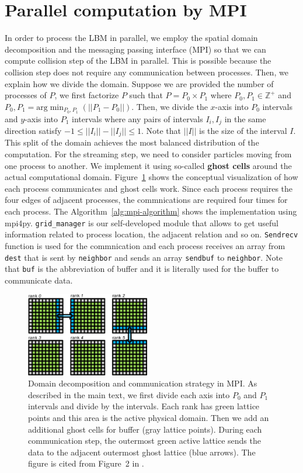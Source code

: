 \section{Parallel computation by MPI}\label{section-mpi}
In order to process the LBM in parallel,
we employ the spatial domain decomposition and
the messaging passing interface (MPI)
so that we can compute collision step of the LBM
in parallel.
This is possible because the collision step does not require
any communication between processes\cite{pastewka2019hpc}.
Then, we explain how we divide the domain.
Suppose we are provided the number of processes of $P$,
we first factorize $P$ such that $P = P_0 \times P_1$
where $P_0, P_1 \in \mathbb{Z}^{+}$
and $P_0, P_1 = \text{arg} \min_{P_0, P_1}(|| P_1 - P_0 ||)$.
Then, we divide the $x$-axis into $P_0$ intervals and
$y$-axis into $P_1$ intervals where
any pairs of intervals $I_{i}, I_{j}$ in the same direction satisfy
$-1 \leq || I_{i} || - ||I_{j}|| \leq 1$.
Note that $||I||$ is the size of the interval $I$.
This split of the domain achieves the most balanced distribution of
the computation.
For the streaming step, we need to consider particles
moving from one process to another.
We implement it using so-called {\bf ghost cells}
around the actual computational domain.
Figure~\ref{mpi-conceptual} shows the conceptual visualization of
how each process communicates and ghost cells work.
Since each process requires the four edges of adjacent
processes, the commnications are required four times
for each process.
The Algorithm~\ref{alg:mpi-algorithm}
shows the implementation using mpi4py.
{\tt grid\_manager} is our self-developed module
that allows to get useful information related to
process location, the adjacent relation and so on.
{\tt Sendrecv} function is used for the commnication and
each process receives an array from {\tt dest} that is sent
by {\tt neighbor} and sends an array {\tt sendbuf} to
{\tt neighbor}.
Note that {\tt buf} is the abbreviation of buffer and
it is literally used for the buffer to communicate data.

\begin{figure}
  \centering
  \includegraphics[width=0.48\textwidth]{imgs/mpi-conceptual.pdf}
  \caption{
    Domain decomposition and communication strategy in MPI.
    As described in the main text, we first divide each axis
    into $P_0$ and $P_1$ intervals and divide by the intervals.
    Each rank has green lattice points and this area is the active physical domain.
    Then we add an additional ghost cells for buffer (gray lattice points).
    During each communication step, the outermost green active lattice
    sends the data to the adjacent outermost ghost lattice (blue arrows).
    The figure is cited from Figure~2 in \cite{pastewka2019hpc}.
  }
  \label{mpi-conceptual}
\end{figure}

